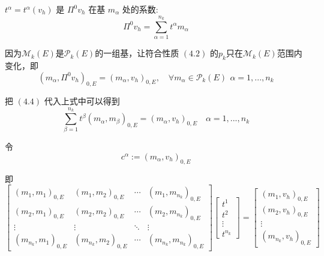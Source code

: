 $t^{\alpha} = t^{\alpha}(v_h)$ 是 $\Pi^0v_h$ 在基 $m_\alpha$ 处的系数: \\

\begin{equation}
\Pi^0v_h = \sum_{\alpha = 1}^{n_k}t^{\alpha}m_{\alpha}
\end{equation}

因为$\mathcal{M}_k(E)$是$\mathcal{P}_k(E)$的一组基，让符合性质 $(4.2)$ 的$p_k$只在$\mathcal{M}_k(E)$范围内变化，即 \\
\begin{equation*}
(m_{\alpha}, \Pi^0 v_h)_{0,E} = (m_{\alpha}, v_h)_{0,E}, \quad \forall m_{\alpha} \in \mathcal {P}_k(E)\,\ \alpha =1,...,n_k
\end{equation*}

把 $(4.4)$ 代入上式中可以得到 \\
\begin{equation*}
\sum_{\beta = 1}^{n_k}t^{\beta}(m_{\alpha}, m_{\beta})_{0,E} = (m_{\alpha}, v_h)_{0,E}\quad \alpha =1,...,n_k 
\end{equation*}

令 \\
\begin{equation}
c^{\alpha}:= (m_{\alpha},v_h)_{0,E}
\end{equation}

即 \\
\begin{equation*}
\begin{bmatrix}
(m_1,m_1)_{0,E} & (m_1,m_2)_{0,E} & \cdots & (m_1,m_{n_k})_{0,E} \\
(m_2,m_1)_{0,E} & (m_2,m_2)_{0,E} & \cdots &
(m_2,m_{n_k})_{0,E} \\
\vdots & \vdots & \ddots & \vdots \\
(m_{n_k}, m_1)_{0,E} & (m_{n_k},m_2)_{0,E} & \cdots & (m_{n_k},m_{n_k})_{0,E}
\end{bmatrix}\begin{bmatrix}
t^1 \\
t^2 \\
\vdots \\
t^{n_k}
\end{bmatrix}
= \begin{bmatrix}
(m_1,v_h)_{0,E} \\
(m_2,v_h)_{0,E} \\
\vdots \\
(m_{n_k},v_h)_{0,E}
\end{bmatrix} 
\end{equation*}

